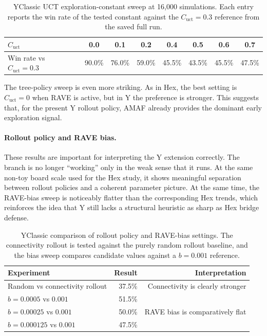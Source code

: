 \documentclass[11pt,a4paper]{article}
\begin{document}
\begin{table}[t]
\centering
\small
\begin{tabular}{@{}lccccccc@{}}
\toprule
$C_{\mathrm{uct}}$ & 0.0 & 0.1 & 0.2 & 0.4 & 0.5 & 0.6 & 0.7 \\
\midrule
Win rate vs $C_{\mathrm{uct}}=0.3$ & 90.0\% & 76.0\% & 59.0\% & 45.5\% & 43.5\% & 45.5\% & 47.5\% \\
\bottomrule
\end{tabular}
\caption{YClassic UCT exploration-constant sweep at 16{,}000 simulations. Each
entry reports the win rate of the tested constant against the
$C_{\mathrm{uct}}=0.3$ reference from the saved full run.}
\label{tab:yclassic-uct}
\end{table}

The tree-policy sweep is even more striking. As in Hex, the best setting is
$C_{\mathrm{uct}}=0$ when RAVE is active, but in Y the preference is stronger.
This suggests that, for the present Y rollout policy, AMAF already provides the
dominant early exploration signal.

\paragraph{Rollout policy and RAVE bias.}

These results are important for interpreting the Y extension correctly. The
branch is no longer ``working'' only in the weak sense that it runs. At the
same non-toy board scale used for the Hex study, it shows meaningful separation
between rollout policies and a coherent parameter picture. At the same time,
the RAVE-bias sweep is noticeably flatter than the corresponding Hex trends,
which reinforces the idea that Y still lacks a structural heuristic as sharp as
Hex bridge defense.

\begin{table}[H]
\centering
\begin{tabular}{@{}lrr@{}}
\toprule
Experiment & Result & Interpretation \\
\midrule
Random vs connectivity rollout & 37.5\% & Connectivity is clearly stronger \\
$b = 0.0005$ vs $0.001$ & 51.5\% & \\
$b = 0.00025$ vs $0.001$ & 50.0\% & RAVE bias is comparatively flat \\
$b = 0.000125$ vs $0.001$ & 47.5\% & \\
\bottomrule
\end{tabular}
\caption{YClassic comparison of rollout policy and RAVE-bias settings. The
connectivity rollout is tested against the purely random rollout baseline, and
the bias sweep compares candidate values against a $b=0.001$ reference.}
\label{tab:yclasic-rollout-rave}
\end{table}
\end{document}
